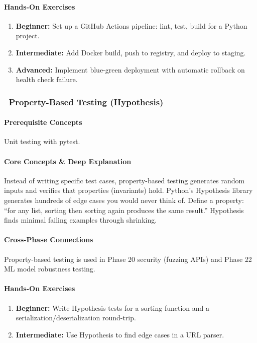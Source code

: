 \documentclass[11pt, a4paper, oneside]{report}
\newcommand{\awareness}[1]{\subsubsection{\texorpdfstring{\fcolorbox{gray!50}{gray!10}{\footnotesize\bfseries\color{gray!50!black} AWARENESS}~#1}{#1}}}
\begin{document}
\paragraph{Hands-On Exercises}
\begin{enumerate}[leftmargin=*]
\item \textbf{Beginner:} Set up a GitHub Actions pipeline: lint, test, build for a Python project.
\item \textbf{Intermediate:} Add Docker build, push to registry, and deploy to staging.
\item \textbf{Advanced:} Implement blue-green deployment with automatic rollback on health check failure.
\end{enumerate}

\awareness{Property-Based Testing (Hypothesis)}

\paragraph{Prerequisite Concepts} Unit testing with pytest.

\paragraph{Core Concepts \& Deep Explanation} Instead of writing specific test cases, property-based testing generates random inputs and verifies that properties (invariants) hold. Python's Hypothesis library generates hundreds of edge cases you would never think of. Define a property: ``for any list, sorting then sorting again produces the same result.'' Hypothesis finds minimal failing examples through shrinking.

\paragraph{Cross-Phase Connections} Property-based testing is used in Phase 20 security (fuzzing APIs) and Phase 22 ML model robustness testing.

\paragraph{Hands-On Exercises}
\begin{enumerate}[leftmargin=*]
\item \textbf{Beginner:} Write Hypothesis tests for a sorting function and a serialization/deserialization round-trip.
\item \textbf{Intermediate:} Use Hypothesis to find edge cases in a URL parser.
\end{enumerate}
\end{document}
